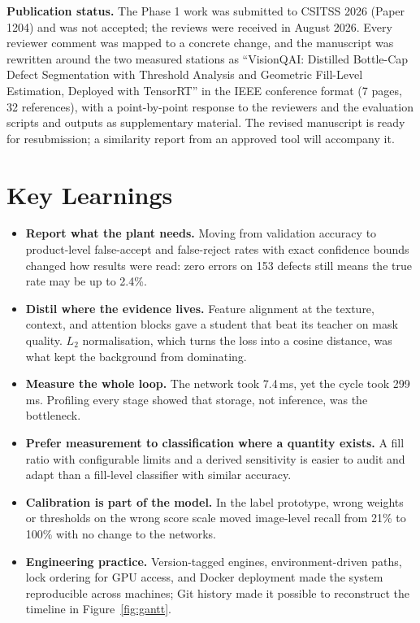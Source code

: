 \noindent\textbf{Publication status.}\label{sec:publication} The Phase 1 work was submitted to CSITSS 2026 (Paper 1204) and was not accepted; the reviews were received in August 2026. Every reviewer comment was mapped to a concrete change, and the manuscript was rewritten around the two measured stations as ``VisionQAI: Distilled Bottle-Cap Defect Segmentation with Threshold Analysis and Geometric Fill-Level Estimation, Deployed with TensorRT'' in the IEEE conference format (7 pages, 32 references), with a point-by-point response to the reviewers and the evaluation scripts and outputs as supplementary material. The revised manuscript is ready for resubmission; a similarity report from an approved tool will accompany it.

\section{Key Learnings}
\label{sec:key-learnings}

\begin{itemize}
    \item \textbf{Report what the plant needs.} Moving from validation accuracy to product-level false-accept and false-reject rates with exact confidence bounds changed how results were read: zero errors on 153 defects still means the true rate may be up to 2.4\%.
    \item \textbf{Distil where the evidence lives.} Feature alignment at the texture, context, and attention blocks gave a student that beat its teacher on mask quality. $L_2$ normalisation, which turns the loss into a cosine distance, was what kept the background from dominating.
    \item \textbf{Measure the whole loop.} The network took 7.4\,ms, yet the cycle took 299\,ms. Profiling every stage showed that storage, not inference, was the bottleneck.
    \item \textbf{Prefer measurement to classification where a quantity exists.} A fill ratio with configurable limits and a derived sensitivity is easier to audit and adapt than a fill-level classifier with similar accuracy.
    \item \textbf{Calibration is part of the model.} In the label prototype, wrong weights or thresholds on the wrong score scale moved image-level recall from 21\% to 100\% with no change to the networks.
    \item \textbf{Engineering practice.} Version-tagged engines, environment-driven paths, lock ordering for GPU access, and Docker deployment made the system reproducible across machines; Git history made it possible to reconstruct the timeline in Figure~\ref{fig:gantt}.
\end{itemize}

